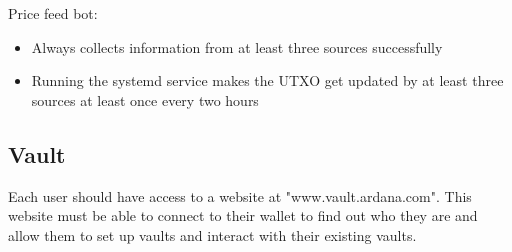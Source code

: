 \documentclass{article} %
\begin{document}
Price feed bot:
\begin{itemize}
  \item Always collects information from at least three sources successfully
  \item Running the systemd service makes the UTXO get updated by at least three
    sources at least once every two hours
\end{itemize}

% 
% 
% 
% 
\subsection{Vault}

Each user should have access to a website at "www.vault.ardana.com".
This website must be able to connect to their wallet to find out who they are
and allow them to set up vaults and interact with their existing vaults.
\end{document}
